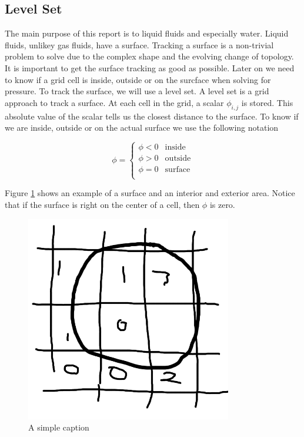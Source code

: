 \subsection{Level Set}

The main purpose of this report is to liquid fluids and especially water. Liquid fluids, unlikey gas fluids, have a surface. Tracking a surface is a non-trivial problem to solve due to the complex shape and the evolving change of topology. It is important to get the surface tracking as good as possible. Later on we need to know if a grid cell is inside, outside or on the surcface when solving for pressure. To track the surface, we will use a level set. A level set is a grid approach to track a surface. At each cell in the grid, a scalar $\phi_{i,j}$ is stored. This absolute value of the scalar tells us the closest distance to the surface. To know if we are inside, outside or on the actual surface we use the following notation

\begin{equation}
\phi = 
\left\{
\begin{array}{ll}
\phi < 0 & \mbox{inside}  \\
\phi > 0 & \mbox{outside} \\
\phi = 0 & \mbox{surface} \\
\end{array}
\right.
\end{equation}

Figure \ref{levetsetexample} shows an example of a surface and an interior and exterior area. Notice that if the surface is right on the center of a cell, then $\phi$ is zero. 

\begin{figure}[ht!]
\centering
\includegraphics[width=90mm]{ch2/levelset.png}
\caption{A simple caption}
\label{levetsetexample}
\end{figure}

